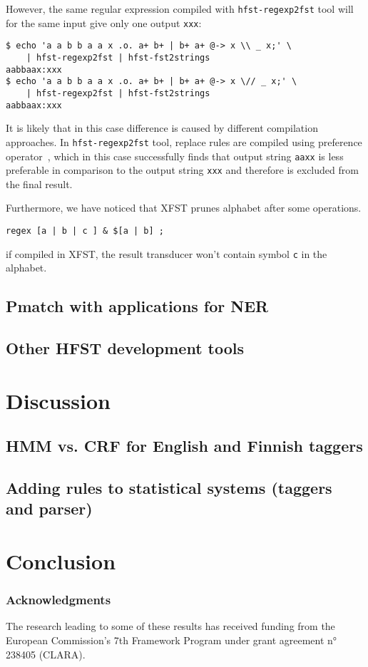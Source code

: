 \documentclass{llncs}
\begin{document}
However, the same regular expression compiled with \verb+hfst-regexp2fst+ tool
will for the same input give only one output \verb+xxx+:
\begin{verbatim}
$ echo 'a a b b a a x .o. a+ b+ | b+ a+ @-> x \\ _ x;' \
    | hfst-regexp2fst | hfst-fst2strings
aabbaax:xxx
$ echo 'a a b b a a x .o. a+ b+ | b+ a+ @-> x \// _ x;' \
    | hfst-regexp2fst | hfst-fst2strings
aabbaax:xxx
\end{verbatim} 
It is likely that in this case difference is caused by different compilation approaches.
In \verb+hfst-regexp2fst+ tool, replace rules are compiled using preference
operator~\cite{drobac/2012}, which in this case successfully finds that output string \verb+aaxx+ is less preferable in comparison to the output string \verb+xxx+ and therefore is excluded from the final result.


Furthermore, we have noticed that XFST prunes alphabet after some operations.

\begin{verbatim}
regex [a | b | c ] & $[a | b] ;
\end{verbatim}
if compiled in XFST, the result transducer won't contain symbol \verb+c+
in the alphabet.

\subsection{Pmatch with applications for NER}

\subsection{Other HFST development tools}

\section{Discussion}\label{hfst:discussion}

\subsection{HMM vs. CRF for English and Finnish taggers}

\subsection{Adding rules to statistical systems (taggers and parser)}

\section{Conclusion}\label{hfst:conclusion}

\subsubsection*{Acknowledgments}
The research leading to some of these results has received funding from the
European Commission's 7th Framework Program under grant agreement n° 238405 (CLARA).



\end{document}
